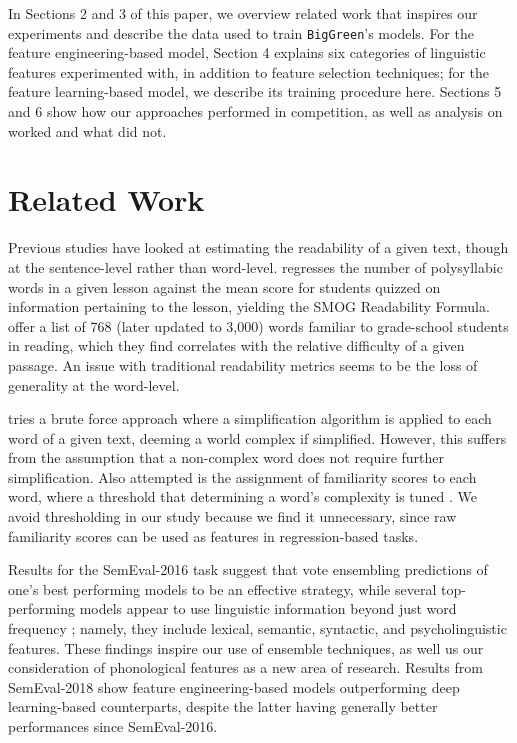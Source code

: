 \documentclass{dcthesis}
\theoremstyle{definition}
\theoremstyle{remark}
\begin{document}
In Sections 2 and 3 of this paper, we overview related work that inspires our experiments and describe the data used to train \texttt{BigGreen}'s models. For the feature engineering-based model, Section 4 explains six categories of linguistic features experimented with, in addition to feature selection techniques; for the feature learning-based model, we describe its training procedure here. Sections 5 and 6 show how our approaches performed in competition, as well as analysis on worked and what did not.

\chapter{Related Work}

Previous studies have looked at estimating the readability of a given text, though at the sentence-level rather than word-level. \citet{10.2307/40011226} regresses the number of polysyllabic words in a given lesson against the mean score for students quizzed on information pertaining to the lesson, yielding the SMOG Readability Formula. \citet{10.2307/1473169} offer a list of 768 (later updated to 3,000) words familiar to grade-school students in reading, which they find correlates with the relative difficulty of a given passage. An issue with traditional readability metrics seems to be the loss of generality at the word-level.

\citet{shardlow2013comparison} tries a brute force approach where a simplification algorithm is applied to each word of a given text, deeming a world complex if simplified. However, this suffers from the assumption that a non-complex word does not require further simplification. Also attempted is the assignment of familiarity scores to each word, where a threshold that determining a word's complexity is tuned \citep{shardlow2013comparison}. We avoid thresholding in our study because we find it unnecessary, since raw familiarity scores can be used as features in regression-based tasks. 

Results for the SemEval-2016 task \citep{zampieriEtAl:2017:NLPTEA} suggest that vote ensembling predictions of one's best performing models to be an effective strategy, while several top-performing models appear to use linguistic information beyond just word frequency \citep{paetzoldspecia2016sv000gg, ronzanoetal2016taln, mukherjeeetal2016ju}; namely, they include lexical, semantic, syntactic, and psycholinguistic features. These findings inspire our use of ensemble techniques, as well us our consideration of phonological features as a new area of research. Results from SemEval-2018 show feature engineering-based models outperforming deep learning-based counterparts, despite the latter having generally better performances since SemEval-2016.
\end{document}

